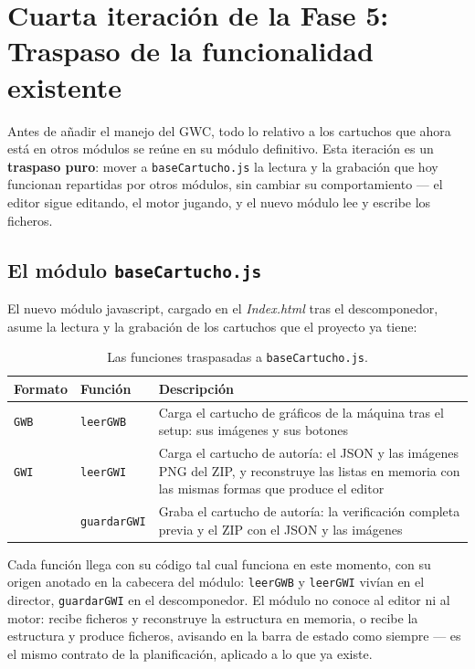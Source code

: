 \section{Cuarta iteración de la Fase 5: Traspaso de la funcionalidad existente}
\label{sec:F5I4}

Antes de añadir el manejo del GWC, todo lo relativo a los cartuchos que ahora está en otros módulos se reúne en su módulo definitivo. Esta iteración es un
\textbf{traspaso puro}: mover a \texttt{baseCartucho.js} la
lectura y la grabación que hoy funcionan repartidas por otros
módulos, sin cambiar su comportamiento — el editor sigue
editando, el motor jugando, y el nuevo módulo lee y escribe los
ficheros.


\subsection{El módulo \texttt{baseCartucho.js}}
\label{sec:F5I4Modulo}

El nuevo módulo javascript, cargado en el \emph{Index.html} tras el descomponedor, asume la lectura y la grabación de los cartuchos que el proyecto ya tiene:

\begin{table}[H]
	\centering
	\begin{tabularx}{\textwidth}{@{}l l X@{}}
		\toprule
		\textbf{Formato} & \textbf{Función} & \textbf{Descripción} \\
		\midrule
		
		\texttt{GWB} & \texttt{leerGWB} & Carga el cartucho de gráficos de
		la máquina tras el setup: sus imágenes y sus botones \\
		
		\texttt{GWI} & \texttt{leerGWI} & Carga el cartucho de autoría: el
		JSON y las imágenes PNG del ZIP, y reconstruye las listas en
		memoria con las mismas formas que produce el editor \\
		
		& \texttt{guardarGWI} & Graba el cartucho de autoría: la
		verificación completa previa y el ZIP con el JSON y las
		imágenes \\
		\bottomrule
	\end{tabularx}
	\caption{Las funciones traspasadas a \texttt{baseCartucho.js}.}
	\label{tab:funcionesTraspaso}
\end{table}

Cada función llega con su código tal cual funciona en este momento, con su origen anotado en la cabecera del módulo: \texttt{leerGWB} y \texttt{leerGWI} vivían en el director, \texttt{guardarGWI} en el descomponedor. El módulo no conoce al editor ni al motor: recibe ficheros y reconstruye la estructura en memoria, o recibe la estructura y produce ficheros, avisando en la barra de estado como siempre — es el mismo contrato de la planificación, aplicado a lo que ya existe.

